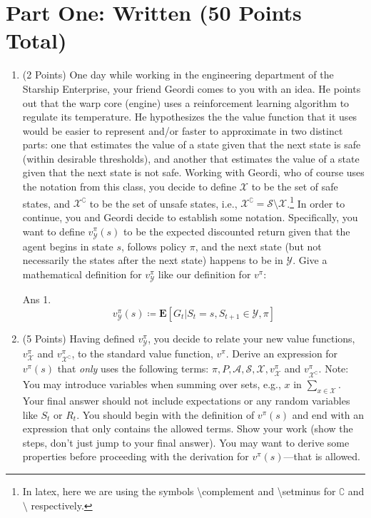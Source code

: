 \documentclass[]{article}
\begin{document}
\section*{Part One: Written (50 Points Total)}
\begin{enumerate}
    \item (2 Points) One day while working in the engineering department of the Starship Enterprise, your friend Geordi comes to you with an idea. He points out that the warp core (engine) uses a reinforcement learning algorithm to regulate its temperature. He hypothesizes the the value function that it uses would be easier to represent and/or faster to approximate in two distinct parts: one that estimates the value of a state given that the next state is safe (within desirable thresholds), and another that estimates the value of a state given that the next state is not safe. Working with Geordi, who of course uses the notation from this class, you decide to define $\mathcal X$ to be the set of safe states, and $\mathcal X^\complement$ to be the set of unsafe states, i.e., $\mathcal X^\complement = \mathcal S \setminus \mathcal X$.\footnote{In latex, here we are using the symbols \textbackslash complement and \textbackslash setminus for $\complement$ and $\setminus$ respectively.} 
    In order to continue, you and Geordi decide to establish some notation. Specifically, you want to define $v^\pi_\mathcal Y(s)$ to be the expected discounted return given that the agent begins in state $s$, follows policy $\pi$, and the next state (but not necessarily the states after the next state) happens to be in $\mathcal Y$. Give a mathematical definition for $v^\pi_\mathcal Y$ like our definition for $v^\pi$:

	{
		\color{blue}
			Ans 1. \begin{equation}
			        v^\pi_\mathcal Y(s)\coloneqq \mathbf{E}[G_t | S_t = s, S_{t+1}  \in \mathcal Y, \pi]
			    \end{equation}
	}

    \item (5 Points) Having defined $v^\pi_\mathcal Y$, you decide to relate your new value functions, $v^\pi_\mathcal X$ and $v^\pi_{\mathcal X^\complement}$, to the standard value function, $v^\pi$. Derive an expression for $v^\pi(s)$ that \emph{only} uses the following terms: $\pi, P, \mathcal A, \mathcal S, \mathcal X, v^\pi_\mathcal X$ and $v^\pi_{\mathcal X^\complement}$. Note: You may introduce variables when summing over sets, e.g., $x$ in  $\sum_{x \in \mathcal X}$. Your final answer should not include expectations or any random variables like $S_t$ or $R_t$. You should begin with the definition of $v^\pi(s)$ and end with an expression that only contains the allowed terms. Show your work (show the steps, don't just jump to your final answer). You may want to derive some properties before proceeding with the derivation for $v^\pi(s)$---that is allowed.


\end{enumerate}
\end{document}
